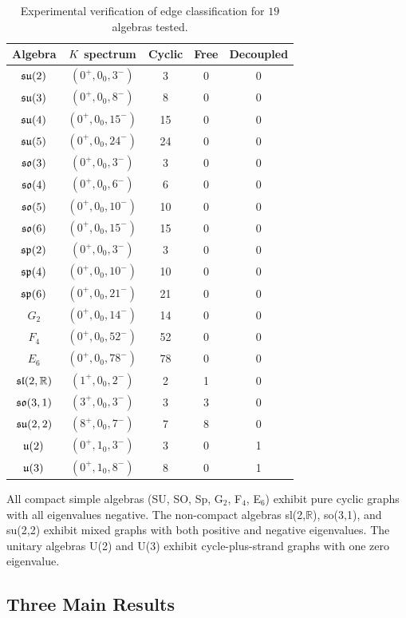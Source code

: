 \begin{table}[h]
\centering
\begin{tabular}{c c c c c}
\hline\hline
Algebra & $K$ spectrum & Cyclic & Free & Decoupled \\
\hline
$\mathfrak{su}(2)$ & $(0^+, 0_0, 3^-)$ & 3 & 0 & 0 \\
$\mathfrak{su}(3)$ & $(0^+, 0_0, 8^-)$ & 8 & 0 & 0 \\
$\mathfrak{su}(4)$ & $(0^+, 0_0, 15^-)$ & 15 & 0 & 0 \\
$\mathfrak{su}(5)$ & $(0^+, 0_0, 24^-)$ & 24 & 0 & 0 \\
$\mathfrak{so}(3)$ & $(0^+, 0_0, 3^-)$ & 3 & 0 & 0 \\
$\mathfrak{so}(4)$ & $(0^+, 0_0, 6^-)$ & 6 & 0 & 0 \\
$\mathfrak{so}(5)$ & $(0^+, 0_0, 10^-)$ & 10 & 0 & 0 \\
$\mathfrak{so}(6)$ & $(0^+, 0_0, 15^-)$ & 15 & 0 & 0 \\
$\mathfrak{sp}(2)$ & $(0^+, 0_0, 3^-)$ & 3 & 0 & 0 \\
$\mathfrak{sp}(4)$ & $(0^+, 0_0, 10^-)$ & 10 & 0 & 0 \\
$\mathfrak{sp}(6)$ & $(0^+, 0_0, 21^-)$ & 21 & 0 & 0 \\
$G_2$ & $(0^+, 0_0, 14^-)$ & 14 & 0 & 0 \\
$F_4$ & $(0^+, 0_0, 52^-)$ & 52 & 0 & 0 \\
$E_6$ & $(0^+, 0_0, 78^-)$ & 78 & 0 & 0 \\
$\mathfrak{sl}(2,\mathbb{R})$ & $(1^+, 0_0, 2^-)$ & 2 & 1 & 0 \\
$\mathfrak{so}(3,1)$ & $(3^+, 0_0, 3^-)$ & 3 & 3 & 0 \\
$\mathfrak{su}(2,2)$ & $(8^+, 0_0, 7^-)$ & 7 & 8 & 0 \\
$\mathfrak{u}(2)$ & $(0^+, 1_0, 3^-)$ & 3 & 0 & 1 \\
$\mathfrak{u}(3)$ & $(0^+, 1_0, 8^-)$ & 8 & 0 & 1 \\
\hline\hline
\end{tabular}
\caption{Experimental verification of edge classification for $19$ algebras tested.}
\end{table}

All compact simple algebras (SU, SO, Sp, G$_2$, F$_4$, E$_6$) exhibit pure cyclic graphs with all eigenvalues negative. The non-compact algebras sl(2,$\mathbb{R}$), so(3,1), and su(2,2) exhibit mixed graphs with both positive and negative eigenvalues. The unitary algebras U(2) and U(3) exhibit cycle-plus-strand graphs with one zero eigenvalue.

\subsection{Three Main Results}\label{sec:main_results}

